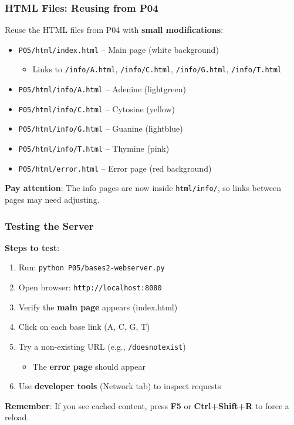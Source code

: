 \documentclass[xcolor=table]{beamer}
\begin{document}
\begin{frame}
\frametitle{HTML Files: Reusing from P04}

Reuse the HTML files from P04 with \textbf{small modifications}:

\vspace{0.2cm}

\begin{itemize}
\item \texttt{P05/html/index.html} -- Main page (white background)
  \begin{itemize}
  \item Links to \texttt{/info/A.html}, \texttt{/info/C.html}, \texttt{/info/G.html}, \texttt{/info/T.html}
  \end{itemize}
\vspace{0.15cm}
\item \texttt{P05/html/info/A.html} -- Adenine (lightgreen)
\item \texttt{P05/html/info/C.html} -- Cytosine (yellow)
\item \texttt{P05/html/info/G.html} -- Guanine (lightblue)
\item \texttt{P05/html/info/T.html} -- Thymine (pink)
\vspace{0.15cm}
\item \texttt{P05/html/error.html} -- Error page (red background)
\end{itemize}

\vspace{0.3cm}

\textbf{Pay attention}: The info pages are now inside \texttt{html/info/}, so links between pages may need adjusting.

\end{frame}

\begin{frame}
\frametitle{Testing the Server}

\textbf{Steps to test}:

\begin{enumerate}
\item Run: \texttt{python P05/bases2-webserver.py}
\item Open browser: \texttt{http://localhost:8080}
\item Verify the \textbf{main page} appears (index.html)
\item Click on each base link (A, C, G, T)
\item Try a non-existing URL (e.g., \texttt{/doesnotexist})
  \begin{itemize}
  \item The \textbf{error page} should appear
  \end{itemize}
\item Use \textbf{developer tools} (Network tab) to inspect requests
\end{enumerate}

\vspace{0.3cm}

\textbf{Remember}: If you see cached content, press \textbf{F5} or \textbf{Ctrl+Shift+R} to force a reload.

\end{frame}
\end{document}
